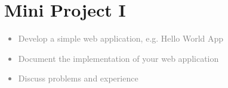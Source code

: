 \chapter{Mini Project I}
\textcolor{gray}{%
\begin{itemize}
    \item Develop a simple web application, e.g. Hello World App
    \item Document the implementation of your web application
    \item Discuss problems and experience
\end{itemize}}
